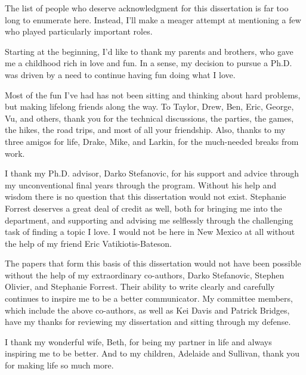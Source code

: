 \documentclass[botnum]{unmeethesis}
\begin{document}
\begin{acknowledgments}
  \vspace{1.1in}
  The list of people who deserve acknowledgment for this dissertation is far too
  long to enumerate here. Instead, I'll make a meager attempt at mentioning a
  few who played particularly important roles. 

  Starting at the beginning, I'd like to thank my parents and brothers, who gave
  me a childhood rich in love and fun. In a sense, my decision to pursue a Ph.D.
  was driven by a need to continue having fun doing what I love.  

  Most of the fun I've had has not been sitting and thinking about hard
  problems, but making lifelong friends along the way. To Taylor, Drew, Ben,
  Eric, George, Vu, and others, thank you for the technical discussions, the
  parties, the games, the hikes, the road trips, and most of all your
  friendship. Also, thanks to my three amigos for life, Drake, Mike, and Larkin,
  for the much-needed breaks from work. 

  I thank my Ph.D. advisor, Darko Stefanovic, for his support and advice through
  my unconventional final years through the program. Without his help and
  wisdom there is no question that this dissertation would not exist. Stephanie
  Forrest deserves a great deal of credit as well, both for bringing me into the
  department, and supporting and advising me selflessly through the challenging
  task of finding a topic I love. I would not be here in New Mexico at all
  without the help of my friend Eric Vatikiotis-Bateson. 

  The papers that form this basis of this dissertation would not have been
  possible without the help of my extraordinary co-authors, Darko Stefanovic,
  Stephen Olivier, and Stephanie Forrest. Their ability to write clearly and
  carefully continues to inspire me to be a better communicator. My committee
  members, which include the above co-authors, as well as Kei Davis and Patrick
  Bridges, have my thanks for reviewing my dissertation and sitting through my
  defense. 

  I thank my wonderful wife, Beth, for being my partner in life and always
  inspiring me to be better. And to my children, Adelaide and Sullivan, thank
  you for making life so much more.
\end{acknowledgments}

\maketitleabstract %
\end{document}
